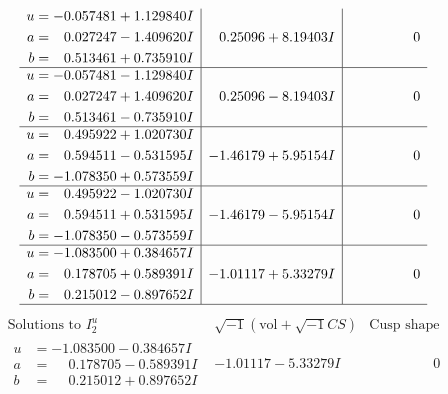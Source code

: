 \documentclass[1p]{elsarticle_modified}
\theoremstyle{definition}
\newcommand{\I}{\sqrt{-1}}
\begin{document}
$$\begin{array}{c|c|c}
\begin{aligned}
u &= -0.057481 + 1.129840 I \\
a &= \phantom{-}0.027247 - 1.409620 I \\
b &= \phantom{-}0.513461 + 0.735910 I\end{aligned}
 & \phantom{-}0.25096 + 8.19403 I & \phantom{-0.000000 } 0 \\ \hline\begin{aligned}
u &= -0.057481 - 1.129840 I \\
a &= \phantom{-}0.027247 + 1.409620 I \\
b &= \phantom{-}0.513461 - 0.735910 I\end{aligned}
 & \phantom{-}0.25096 - 8.19403 I & \phantom{-0.000000 } 0 \\ \hline\begin{aligned}
u &= \phantom{-}0.495922 + 1.020730 I \\
a &= \phantom{-}0.594511 - 0.531595 I \\
b &= -1.078350 + 0.573559 I\end{aligned}
 & -1.46179 + 5.95154 I & \phantom{-0.000000 } 0 \\ \hline\begin{aligned}
u &= \phantom{-}0.495922 - 1.020730 I \\
a &= \phantom{-}0.594511 + 0.531595 I \\
b &= -1.078350 - 0.573559 I\end{aligned}
 & -1.46179 - 5.95154 I & \phantom{-0.000000 } 0 \\ \hline\begin{aligned}
u &= -1.083500 + 0.384657 I \\
a &= \phantom{-}0.178705 + 0.589391 I \\
b &= \phantom{-}0.215012 - 0.897652 I\end{aligned}
 & -1.01117 + 5.33279 I & \phantom{-0.000000 } 0\\
 \hline 
 \end{array}$$\newpage$$\begin{array}{c|c|c}  
\text{Solutions to }I^u_{2}& \I (\text{vol} + \sqrt{-1}CS) & \text{Cusp shape}\\
 \hline 
\begin{aligned}
u &= -1.083500 - 0.384657 I \\
a &= \phantom{-}0.178705 - 0.589391 I \\
b &= \phantom{-}0.215012 + 0.897652 I\end{aligned}
 & -1.01117 - 5.33279 I & \phantom{-0.000000 } 0 \\ \hline\begin{aligned}

\end{aligned}
\end{array}$$
\end{document}
